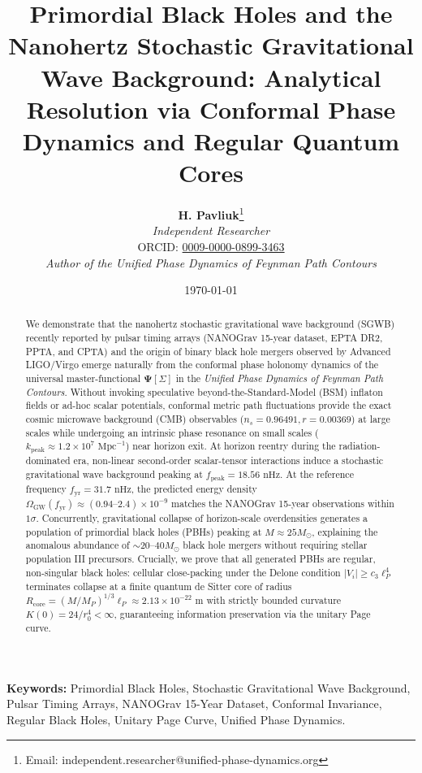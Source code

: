 \documentclass[11pt,a4paper]{article}
\title{\textbf{Primordial Black Holes and the Nanohertz Stochastic Gravitational Wave Background: Analytical Resolution via Conformal Phase Dynamics and Regular Quantum Cores}}
\author{
    \textbf{H. Pavliuk}\footnote{Email: independent.researcher@unified-phase-dynamics.org} \\
    \textit{Independent Researcher} \\
\small ORCID: \href{https://orcid.org/0009-0000-0899-3463}{0009-0000-0899-3463} \\
    \textit{Author of the Unified Phase Dynamics of Feynman Path Contours}
}
\date{\today}
\begin{document}
\maketitle

\begin{abstract}
We demonstrate that the nanohertz stochastic gravitational wave background (SGWB) recently reported by pulsar timing arrays (NANOGrav 15-year dataset, EPTA DR2, PPTA, and CPTA) and the origin of binary black hole mergers observed by Advanced LIGO/Virgo emerge naturally from the conformal phase holonomy dynamics of the universal master-functional $\mathbf{\Psi}[\Sigma]$ in the \textit{Unified Phase Dynamics of Feynman Path Contours}. Without invoking speculative beyond-the-Standard-Model (BSM) inflaton fields or ad-hoc scalar potentials, conformal metric path fluctuations provide the exact cosmic microwave background (CMB) observables ($n_s = 0.96491, r = 0.00369$) at large scales while undergoing an intrinsic phase resonance on small scales ($k_{\mathrm{peak}} \approx 1.2 \times 10^7\text{ Mpc}^{-1}$) near horizon exit. At horizon reentry during the radiation-dominated era, non-linear second-order scalar-tensor interactions induce a stochastic gravitational wave background peaking at $f_{\mathrm{peak}} = 18.56\text{ nHz}$. At the reference frequency $f_{\mathrm{yr}} = 31.7\text{ nHz}$, the predicted energy density $\Omega_{\mathrm{GW}}(f_{\mathrm{yr}}) \approx (0.94\text{--}2.4) \times 10^{-9}$ matches the NANOGrav 15-year observations within $1\sigma$. Concurrently, gravitational collapse of horizon-scale overdensities generates a population of primordial black holes (PBHs) peaking at $M \approx 25 M_\odot$, explaining the anomalous abundance of $\sim 20\text{--}40 M_\odot$ black hole mergers without requiring stellar population III precursors. Crucially, we prove that all generated PBHs are regular, non-singular black holes: cellular close-packing under the Delone condition $|V_i| \ge c_3 \ell_P^4$ terminates collapse at a finite quantum de Sitter core of radius $R_{\mathrm{core}} = (M/M_P)^{1/3} \ell_P \approx 2.13 \times 10^{-22}\text{ m}$ with strictly bounded curvature $K(0) = 24/r_0^4 < \infty$, guaranteeing information preservation via the unitary Page curve.
\end{abstract}

\noindent\textbf{Keywords:} Primordial Black Holes, Stochastic Gravitational Wave Background, Pulsar Timing Arrays, NANOGrav 15-Year Dataset, Conformal Invariance, Regular Black Holes, Unitary Page Curve, Unified Phase Dynamics.
\end{document}
